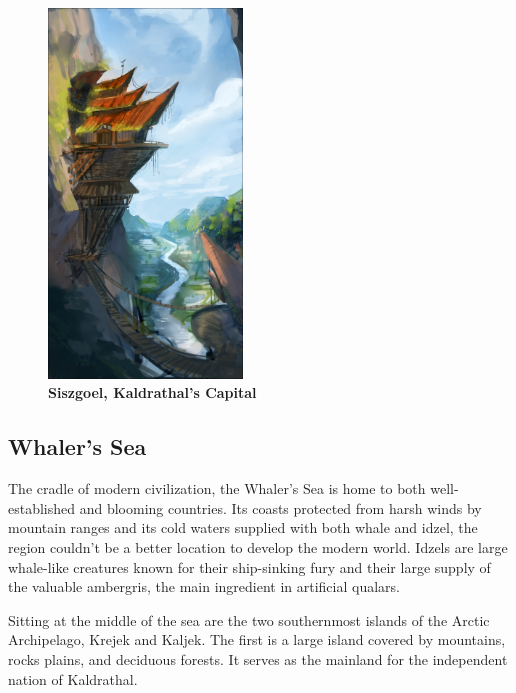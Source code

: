 
\begin{figure}[t]
    \centering
    \includegraphics[width=0.46\textwidth]{01yuadrem/img/13siszgoel.png}
    \caption*{\centering \large{\textbf{Siszgoel, Kaldrathal's Capital}}} %
\end{figure}

\subsection*{Whaler's Sea} \label{ssec::whalerssea}

The cradle of modern civilization, the Whaler's Sea is home to both well-established and blooming countries.
Its coasts protected from harsh winds by mountain ranges and its cold waters supplied with both whale and idzel, the region couldn't be a better location to develop the modern world.
Idzels are large whale-like creatures known for their ship-sinking fury and their large supply of the valuable ambergris, the main ingredient in artificial qualars.

Sitting at the middle of the sea are the two southernmost islands of the Arctic Archipelago, Krejek and Kaljek.
The first is a large island covered by mountains, rocks plains, and deciduous forests.
It serves as the mainland for the independent nation of Kaldrathal.

